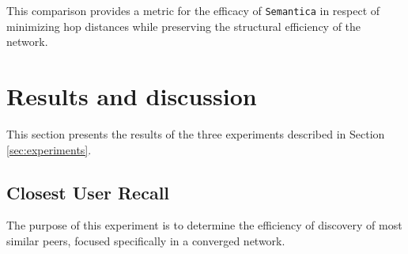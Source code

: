 \documentclass[10pt,journal]{IEEEtran}
\newcommand{\todo}[1]{\textcolor{red}{\textbf{[TODO: #1]}}}
\newcommand{\algorithmname}{\texttt{Semantica}}
\begin{document}
This comparison provides a metric for the efficacy of \algorithmname{} in respect of minimizing hop distances while preserving the structural efficiency of the network.




\section{Results and discussion}
\label{sec:resultsdiscussion}
This section presents the results of the three experiments described in Section \ref{sec:experiments}.

\subsection{Closest User Recall}

The purpose of this experiment is to determine the efficiency of discovery of most similar peers, focused specifically in a converged network.
\end{document}
